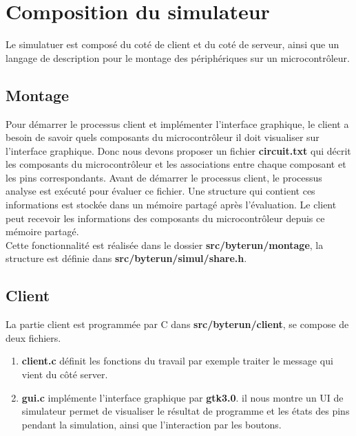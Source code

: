 \documentclass[14px]{article}
\begin{document}
\clearpage
\pagestyle{fancy}
\rhead{\thepage}
\fancyfoot{}
\section{Composition du simulateur}
Le simulatuer est composé du coté de client et du coté de serveur, ainsi que un langage de description pour le montage des périphériques sur un microcontrôleur.

\subsection{Montage}
Pour démarrer le processus client et implémenter l'interface graphique, le client a besoin de savoir quels composants du microcontrôleur il doit visualiser sur l'interface graphique. Donc 
nous devons proposer un fichier \textbf{circuit.txt} qui décrit les composants du microcontrôleur et les associations entre chaque composant et les pins correspondants. Avant de démarrer le processus client, le processus analyse est exécuté pour évaluer ce fichier. Une structure qui contient ces informations est stockée dans un mémoire partagé après l'évaluation. Le client peut recevoir les informations des composants du microcontrôleur depuis ce mémoire partagé.\\
Cette fonctionnalité est réalisée dans le dossier \textbf{src/byterun/montage}, la structure est définie dans \textbf{src/byterun/simul/share.h}.


\subsection{Client}
La partie client est programmée par C dans \textbf{src/byterun/client}, se compose de deux fichiers. 
\begin{enumerate}
\item \textbf{client.c} définit les fonctions du travail par exemple traiter le message qui vient du côté server.

\item \textbf{gui.c} implémente l'interface graphique par \textbf{gtk3.0}.
il nous montre un UI de simulateur permet de visualiser le résultat de programme et les états des pins pendant la simulation, ainsi que l'interaction par les boutons.\\
\end{enumerate}
 
\end{document}
